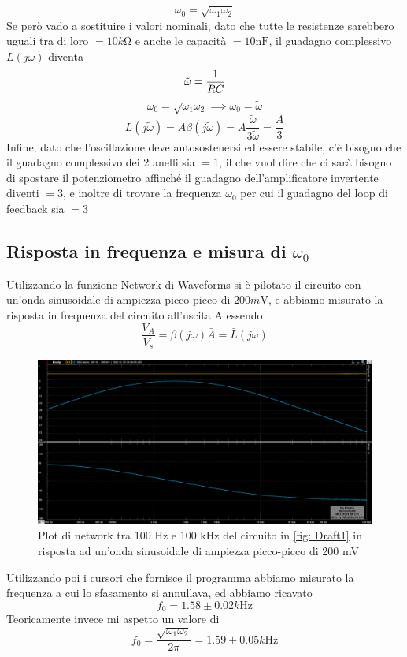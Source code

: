 \documentclass[10pt, a4paper, italian]{article}
\begin{document}
\[
\omega_0 =\sqrt{\omega_1 \omega_2}
\]
Se però vado a sostituire i valori nominali, dato che tutte le resistenze sarebbero uguali tra di loro $= 10 \si{k\ohm}$ e anche le capacità $= 10 \si{\nano\F}$, il guadagno complessivo $L(j\omega)$ diventa
\[
\tilde{\omega}=\frac{1}{RC}\\
\]
\[
\omega_0 =\sqrt{\omega_1 \omega_2} \implies \omega_0=\tilde{\omega}
\]
\[
L(j\tilde{\omega})=A\beta(j\tilde{\omega})=A \frac{\tilde{\omega}}{3\tilde{\omega}}=\frac{A}{3}
\]
Infine, dato che l'oscillazione deve autosostenersi ed essere stabile, c'è bisogno che il guadagno complessivo dei 2 anelli sia $=1$, il che vuol dire che ci sarà bisogno di spostare il potenziometro affinché il guadagno dell'amplificatore invertente diventi $=3$, e inoltre di trovare la frequenza $\omega_0$ per cui il guadagno del loop di feedback sia $=3$
\subsection{Risposta in frequenza e misura di $\omega_0$}
Utilizzando la funzione Network di Waveforms si è pilotato il circuito con un'onda sinusoidale di ampiezza picco-picco di $200 \si{m\V}$, e abbiamo misurato la risposta in frequenza del circuito all'uscita A essendo 
\[
\frac{V_A}{V_s} = \beta(j\omega) \bar{A} = \bar{L}(j\omega)
\]
\begin{figure}[H]
    \centering
	\includegraphics[scale=0.5]{3a}
    \caption{Plot di network tra 100 Hz e 100 kHz del circuito in \cref{fig: Draft1} in risposta ad un'onda sinusoidale di ampiezza picco-picco di 200 mV }
    \label{fig: 3a}
\end{figure}
Utilizzando poi i cursori che fornisce il programma abbiamo misurato la frequenza a cui lo sfasamento si annullava, ed abbiamo ricavato 
\[
f_0=1.58 \pm 0.02 \si{k\Hz}
\]
Teoricamente invece mi aspetto un valore di
\[
f_0 =\frac{\sqrt{\omega_1 \omega_2}}{2\pi}=1.59 \pm 0.05 \si{k\Hz}
\]
\end{document}
